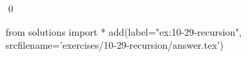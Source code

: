 
\begin{ex}
  \label{ex:10-29-recursion}
  
  \qed
\end{ex}
\begin{python0}
from solutions import *
add(label="ex:10-29-recursion",
    srcfilename='exercises/10-29-recursion/answer.tex')
\end{python0}
